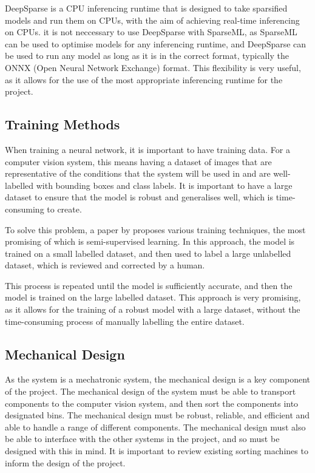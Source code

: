 DeepSparse is a CPU inferencing runtime that is designed to take sparsified models and run them on CPUs, with the aim of achieving real-time inferencing on CPUs. it is not neccessary to use DeepSparse with SparseML, as SparseML can be used to optimise models for any inferencing runtime, and DeepSparse can be used to run any model as long as it is in the correct format, typically the ONNX (Open Neural Network Exchange) format. This flexibility is very useful, as it allows for the use of the most appropriate inferencing runtime for the project.

\subsection{Training Methods}
When training a neural network, it is important to have training data. For a computer vision system, this means having a dataset of images that are representative of the conditions that the system will be used in and are well-labelled with bounding boxes and class labels. It is important to have a large dataset to ensure that the model is robust and generalises well, which is time-consuming to create.

To solve this problem, a paper by \citet{Yang_2023} proposes various training techniques, the most promising of which is semi-supervised learning. In this approach, the model is trained on a small labelled dataset, and then used to label a large unlabelled dataset, which is reviewed and corrected by a human.

This process is repeated until the model is sufficiently accurate, and then the model is trained on the large labelled dataset. This approach is very promising, as it allows for the training of a robust model with a large dataset, without the time-consuming process of manually labelling the entire dataset.

\subsection{Mechanical Design}
As the system is a mechatronic system, the mechanical design is a key component of the project. The mechanical design of the system must be able to transport components to the computer vision system, and then sort the components into designated bins. The mechanical design must be robust, reliable, and efficient and able to handle a range of different components. The mechanical design must also be able to interface with the other systems in the project, and so must be designed with this in mind. It is important to review existing sorting machines to inform the design of the project.
